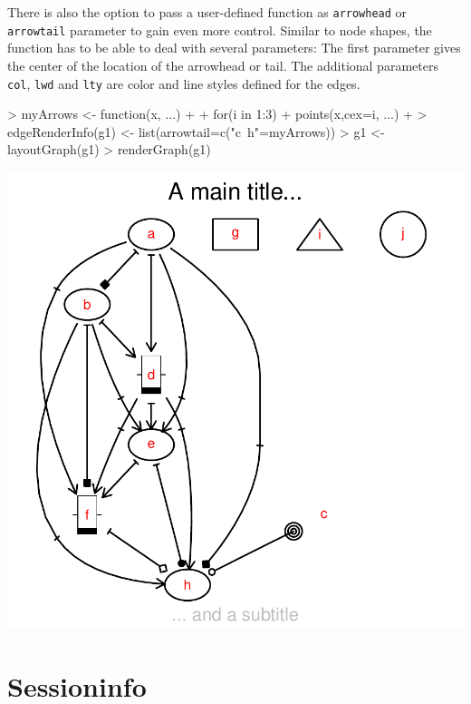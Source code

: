\documentclass{article}
\newcommand{\Robject}[1]{{\texttt{#1}}}
\begin{document}
There is also the option to pass a user-defined function as
\Robject{arrowhead} or \Robject{arrowtail} parameter to gain even more
control. Similar to node shapes, the function has to be able to deal
with several parameters: The first parameter gives the center of the
location of the arrowhead or tail. The additional parameters
\Robject{col}, \Robject{lwd} and \Robject{lty} are color and line
styles defined for the edges.
\begin{Schunk}
\begin{Sinput}
> myArrows <- function(x, ...)
+ {
+ for(i in 1:3)
+ points(x,cex=i, ...)
+ }
> edgeRenderInfo(g1) <- list(arrowtail=c("c~h"=myArrows))
> g1 <- layoutGraph(g1)
> renderGraph(g1)
\end{Sinput}
\end{Schunk}
\includegraphics{newRgraphvizInterface-userDefinedEdge}



\section{Sessioninfo}
\end{document}
